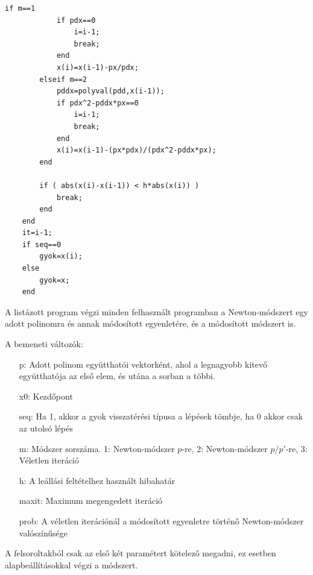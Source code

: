 \documentclass[a4paper,12pt]{report}
\begin{document}
\begin{appendices}
\begin{lstlisting}[caption=Newton.m]
        if m==1                                                     
            if pdx==0                                               
                i=i-1;                                              
                break;                                              
            end                                                     
            x(i)=x(i-1)-px/pdx;                                     
        elseif m==2                                                 
            pddx=polyval(pdd,x(i-1));                               
            if pdx^2-pddx*px==0                                     
                i=i-1;                                              
                break;                                              
            end                                                     
            x(i)=x(i-1)-(px*pdx)/(pdx^2-pddx*px);                   
        end                                                         
                                                                    
        if ( abs(x(i)-x(i-1)) < h*abs(x(i)) )                       
            break;                                                  
        end                                                         
    end                                                             
    it=i-1;                                                         
    if seq==0                                                       
        gyok=x(i);                                                  
    else                                                            
        gyok=x;                                                     
    end                                                             
			\end{lstlisting}
			A listázott program végzi minden felhasznált programban a Newton-módszert egy adott polinomra és annak módosított egyenletére, és a módosított módszert is.
			        
            A bemeneti változók:
			\begin{enumerate}
				\item[p:] Adott polinom együtthatói vektorként, ahol a legnagyobb kitevő együtthatója az első elem, és utána a sorban a többi.
				\item[x0:] Kezdőpont
				\item[seq:] Ha 1, akkor a gyok visszatérési típusa a lépések tömbje, ha 0 akkor csak az utolsó lépés
				\item[m:] Módszer sorszáma. 1: Newton-módszer $p$-re, 2: Newton-módszer $p/p'$-re, 3: Véletlen iteráció
				\item[h:] A leállási feltételhez használt hibahatár
				\item[maxit:] Maximum megengedett iteráció
				\item[prob:] A véletlen iterációnál a módosított egyenletre történő Newton-módszer valószínűsége
			\end{enumerate}
			A felsoroltakból csak az első két paramétert kötelező megadni, ez esetben alapbeállításokkal végzi a módszert.


\end{appendices}
\end{document}
